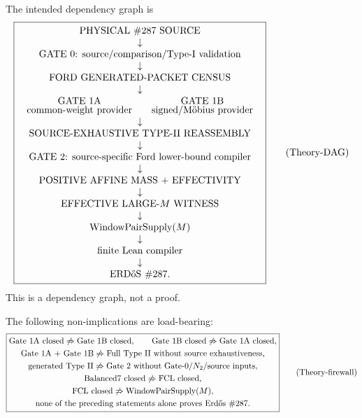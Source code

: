 \documentclass[11pt]{article}
\theoremstyle{definition}
\newcommand{\1}{\mathbf 1}
\newcommand{\WPS}{\operatorname{WindowPairSupply}}
\begin{document}
The intended dependency graph is
\[
\boxed{
\begin{array}{c}
\text{PHYSICAL \#287 SOURCE}\\
\downarrow\\
\text{GATE 0: source/comparison/Type-I validation}\\
\downarrow\\
\text{FORD GENERATED-PACKET CENSUS}\\
\downarrow\\
\begin{array}{ccc}
\text{GATE 1A}&&\text{GATE 1B}\\[-1mm]
\text{common-weight provider}&&\text{signed/M\"obius provider}
\end{array}\\
\downarrow\\
\text{SOURCE-EXHAUSTIVE TYPE-II REASSEMBLY}\\
\downarrow\\
\text{GATE 2: source-specific Ford lower-bound compiler}\\
\downarrow\\
\text{POSITIVE AFFINE MASS + EFFECTIVITY}\\
\downarrow\\
\text{EFFECTIVE LARGE-}M\text{ WITNESS}\\
\downarrow\\
\WPS(M)\\
\downarrow\\
\text{finite Lean compiler}\\
\downarrow\\
\text{ERD\H{o}S \#287.}
\end{array}}
\tag{Theory-DAG}
\]
This is a dependency graph, not a proof.

The following non-implications are load-bearing:
\[
\boxed{
\begin{gathered}
\text{Gate 1A closed}\not\Rightarrow\text{Gate 1B closed},\qquad
\text{Gate 1B closed}\not\Rightarrow\text{Gate 1A closed},\\
\text{Gate 1A + Gate 1B}\not\Rightarrow\text{Full Type II without source exhaustiveness},\\
\text{generated Type II}\not\Rightarrow\text{Gate 2 without Gate-0/$N_2$/source inputs},\\
\text{Balanced7 closed}\not\Rightarrow\text{FCL closed},\\
\text{FCL closed}\not\Rightarrow\WPS(M),\\
\text{none of the preceding statements alone proves Erd\H{o}s \#287.}
\end{gathered}}
\tag{Theory-firewall}
\]
\end{document}
